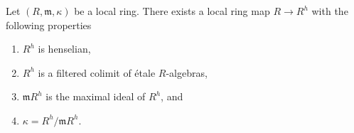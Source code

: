 %
\begin{lemma}
\label{lemma-henselization}
Let $(R, \mathfrak m, \kappa)$ be a local ring. There exists a
local ring map $R \to R^h$ with the following properties
\begin{enumerate}
\item $R^h$ is henselian,
\item $R^h$ is a filtered colimit of \'etale $R$-algebras,
\item $\mathfrak m R^h$ is the
maximal ideal of $R^h$, and
\item $\kappa = R^h/\mathfrak m R^h$.
\end{enumerate}
\end{lemma}

